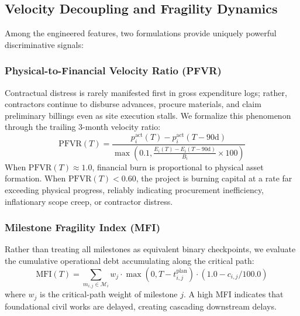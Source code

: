 \documentclass[conference]{IEEEtran}
\begin{document}
\subsection{Velocity Decoupling and Fragility Dynamics}
Among the engineered features, two formulations provide uniquely powerful discriminative signals:

\subsubsection{Physical-to-Financial Velocity Ratio (PFVR)}
Contractual distress is rarely manifested first in gross expenditure logs; rather, contractors continue to disburse advances, procure materials, and claim preliminary billings even as site execution stalls. We formalize this phenomenon through the trailing 3-month velocity ratio:
\begin{equation}
\text{PFVR}(T) = \frac{p_i^{\text{act}}(T) - p_i^{\text{act}}(T - 90 \text{d})}{\max\left(0.1, \frac{E_i(T) - E_i(T - 90 \text{d})}{B_i} \times 100\right)}
\end{equation}
When $\text{PFVR}(T) \approx 1.0$, financial burn is proportional to physical asset formation. When $\text{PFVR}(T) < 0.60$, the project is burning capital at a rate far exceeding physical progress, reliably indicating procurement inefficiency, inflationary scope creep, or contractor distress.

\subsubsection{Milestone Fragility Index (MFI)}
Rather than treating all milestones as equivalent binary checkpoints, we evaluate the cumulative operational debt accumulating along the critical path:
\begin{equation}
\text{MFI}(T) = \sum_{m_{i,j} \in \mathcal{M}_i} w_j \cdot \max(0, T - t_{i,j}^{\text{plan}}) \cdot (1.0 - c_{i,j}/100.0)
\end{equation}
where $w_j$ is the critical-path weight of milestone $j$. A high MFI indicates that foundational civil works are delayed, creating cascading downstream delays.
\end{document}
